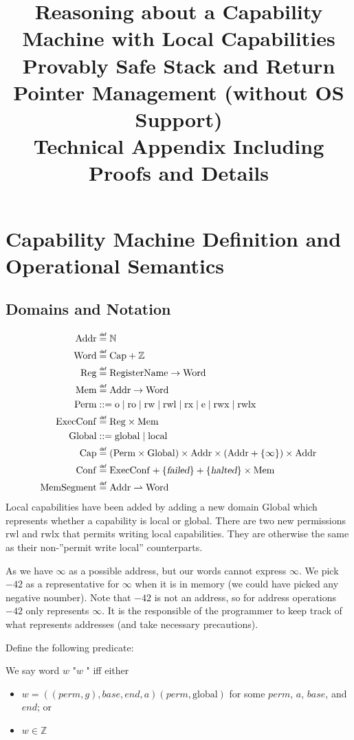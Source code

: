 \documentclass[a4paper]{article}
\title{Reasoning about a Capability Machine with Local Capabilities\\
 Provably Safe Stack and Return Pointer Management (without OS Support)\\
 Technical Appendix Including Proofs and Details}
\newcommand{\parfun}{\rightharpoonup}
\newcommand{\var}[1]{\mathit{#1}}
\newcommand{\gl}{\var{g}}
\newcommand{\addr}{\var{a}}
\newcommand{\start}{\var{base}}
\newcommand{\addrend}{\var{end}}
\newcommand{\inftyend}{-42}
\newcommand{\perm}{\var{perm}}
\newcommand{\stdcap}[1][(\perm,\gl)]{\left(#1,\start,\addrend,\addr \right)}
\newcommand{\failed}{\textsl{failed}}
\newcommand{\halted}{\textsl{halted}}
\newcommand{\plaindom}[1]{\mathrm{#1}}
\newcommand{\Caps}{\plaindom{Cap}}
\newcommand{\Words}{\plaindom{Word}}
\newcommand{\Addrs}{\plaindom{Addr}}
\newcommand{\ExecConfs}{\plaindom{ExecConf}}
\newcommand{\RegName}{\plaindom{RegisterName}}
\newcommand{\Regs}{\plaindom{Reg}}
\newcommand{\Heaps}{\plaindom{Mem}}
\newcommand{\HeapSegments}{\plaindom{MemSegment}}
\newcommand{\Confs}{\plaindom{Conf}}
\newcommand{\nats}{\mathbb{N}}
\newcommand{\ints}{\mathbb{Z}}
\newcommand{\Perms}{\plaindom{Perm}}
\newcommand{\Globals}{\plaindom{Global}}
\newcommand{\plainperm}[1]{\mathrm{#1}}
\newcommand{\noperm}{\plainperm{o}}
\newcommand{\readonly}{\plainperm{ro}}
\newcommand{\readwrite}{\plainperm{rw}}
\newcommand{\exec}{\plainperm{rx}}
\newcommand{\entry}{\plainperm{e}}
\newcommand{\rwx}{\plainperm{rwx}}
\newcommand{\readwritel}{\plainperm{rwl}}
\newcommand{\rwlx}{\plainperm{rwlx}}
\newcommand{\local}{\plainperm{local}}
\newcommand{\glob}{\plainperm{global}}
\newcommand{\nonlocal}[1]{\ensuremath{#1} \text{ is non-local}}
\newcommand{\isdef}{\mathrel{\overset{\makebox[0pt]{\mbox{\normalfont\tiny\sffamily def}}}{=}}}
\newcommand\bnfdef{\mathrel{::=}}
\begin{document}
\maketitle
\tableofcontents

\section{Capability Machine Definition and Operational Semantics}
\subsection{Domains and Notation}

\begin{align*}
  \Addrs &\isdef \nats\\
  \Words &\isdef \Caps + \ints \\
  \Regs  &\isdef \RegName \rightarrow \Words\\
  \Heaps &\isdef \Addrs \rightarrow \Words \\
  \Perms &\bnfdef  \noperm\mid \readonly\mid \readwrite\mid \readwritel\mid \exec\mid \entry\mid \rwx\mid \rwlx\\
  \ExecConfs  &\isdef \Regs \times \Heaps \\
  \Globals & \bnfdef \glob\mid \local \\
  \Caps  &\isdef (\Perms \times \Globals) \times \Addrs \times (\Addrs + \{ \infty \}) \times \Addrs\\
  \Confs &\isdef \ExecConfs + \{\failed \} + \{\halted\} \times \Heaps \\
  \HeapSegments &\isdef \Addrs \parfun \Words
\end{align*}
Local capabilities have been added by adding a new domain $\Globals$ which represents whether a capability is local or global. There are two new permissions $\readwritel$ and $\rwlx$ that permits writing local capabilities. They are otherwise the same as their non-''permit write local'' counterparts.

As we have $\infty$ as a possible address, but our words cannot express $\infty$. We pick $\inftyend$ as a representative for $\infty$ when it is in memory (we could have picked any negative noumber). Note that $\inftyend$ is not an address, so for address operations $\inftyend$ only represents $\infty$. It is the responsible of the programmer to keep track of what represents addresses (and take necessary precautions).

Define the following predicate:
\begin{definition}
  \label{def:non-local-cap}
  We say word $w$ "\nonlocal{w}" iff either
  \begin{itemize}
  \item $w = \stdcap{(\perm,\glob)}$ for some $\perm$, $\addr$, $\start$, and $\addrend$; or
  \item $w \in \ints$
  \end{itemize}
\end{definition}
\end{document}
